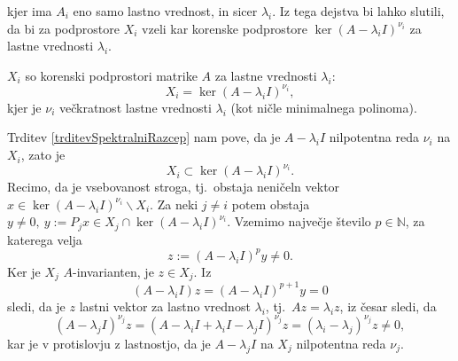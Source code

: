 \documentclass[mat1]{fmfdelo}
\newcommand{\N}{\mathbb N}
\begin{document}
kjer ima $A_i$ eno samo lastno vrednost, in sicer $\lambda_i$. Iz tega dejstva bi lahko slutili, da bi za podprostore $X_i$ vzeli kar korenske podprostore $\ker (A - \lambda_i I)^{\nu_i}$ za lastne vrednosti $\lambda_i$.
\begin{trditev}
    $X_i$ so korenski podprostori matrike $A$ za lastne vrednosti $\lambda_i$:
    \begin{equation*}
        X_i = \ker (A - \lambda_i I)^{\nu_i},
    \end{equation*}
    kjer je $\nu_i$ večkratnost lastne vrednosti $\lambda_i$ (kot ničle minimalnega polinoma).
\end{trditev}
\begin{dokaz}
    Trditev \ref{trditevSpektralniRazcep} nam pove, da je $A - \lambda_i I$ nilpotentna reda $\nu_i$ na $X_i$, zato je
    \begin{equation} \label{strogaVsebovanost}
        X_i \subset \ker (A - \lambda_i I)^{\nu_i}.
    \end{equation}
    Recimo, da je vsebovanost stroga, tj.\ obstaja neničeln vektor $x \in \ker (A - \lambda_i I)^{\nu_i} \backslash X_i$. Za neki $j \neq i$ potem obstaja $y \neq 0,\ y := P_j x \in X_j \cap \ker (A - \lambda_i I)^{\nu_i}$. Vzemimo največje število $p \in \N$, za katerega velja
    \begin{equation*}
        z := (A - \lambda_i I)^p y \neq 0.
    \end{equation*}
    Ker je $X_j$ $A$-invarianten, je $z \in X_j$. Iz
    \begin{equation*}
        (A - \lambda_i I) z = (A - \lambda_i I)^{p+1} y = 0
    \end{equation*}
    sledi, da je $z$ lastni vektor za lastno vrednost $\lambda_i$, tj.\ $A z = \lambda_i z$, iz česar sledi, da
    \begin{equation*}
        (A - \lambda_j I)^{\nu_j} z = \left(A - \lambda_i I + \lambda_i I - \lambda_j I\right)^{\nu_j} z = (\lambda_i - \lambda_j)^{\nu_j} z \neq 0,
    \end{equation*}
    kar je v protislovju z lastnostjo, da je $A - \lambda_j I$ na $X_j$ nilpotentna reda $\nu_j$.
\end{dokaz}
\end{document}
